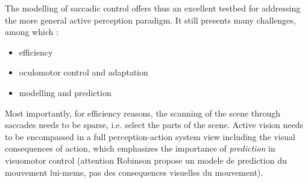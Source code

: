\documentclass[12pt,twoside,openright]{article}
\begin{document}
	The modelling of saccadic control offers thus an excellent testbed for addressing the more general active perception paradigm. It still presents many challenges, among which :
	\begin{itemize}
		\item efficiency
		\item oculomotor control and adaptation
		\item modelling and prediction
	\end{itemize}
	
	{\color{blue} Most importantly, for efficiency reasons, the scanning of the scene through saccades needs to be sparse, i.e. select the parts of the scene.
	Active vision needs to be encompassed in a full perception-action system view including the visual consequences of action, which emphasizes the importance of \emph{prediction} in visuomotor control \cite{Robinson1975,berthoz1996neural}} {\color{green} (attention Robinson propose un modele de prediction du mouvement lui-meme, pas des consequences visuelles du mouvement).}
\end{document}
